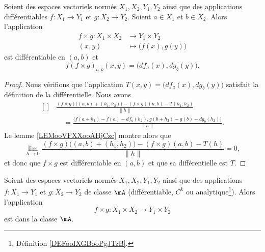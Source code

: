\begin{lemma}	\label{LEMooAAYVooJZyRTq}
	Soient des espaces vectoriels normés \( X_1, X_2,Y_1,Y_2\) ainsi que des applications différentiables \(f \colon X_1\to Y_1  \) et \(g \colon X_2\to Y_2  \). Soient \( a\in X_1\) et \( b\in X_2\). Alors l'application
	\begin{equation}
		\begin{aligned}
			f\times g\colon X_1\times X_2 & \to Y_1\times Y_2              \\
			(x,y)                         & \mapsto \big( f(x), g(y) \big)
		\end{aligned}
	\end{equation}
	est différentiable en \( (a,b)\) et
	\begin{equation}
		f(f\times g)_{a,b}(x,y)=\big( df_a(x), dg_b(y) \big).
	\end{equation}
\end{lemma}

\begin{proof}
	Nous vérifions que l'application \( T(x,y)=\big( df_a(x), dg_b(y) \big)\) satisfait la définition de la différentielle. Nous avons
	\begin{equation}
		\begin{aligned}[]
			 & \frac{ (f\times g)\big( (a,b)+(h_1,h_2) \big)-(f\times g)(a,b)-T(h_1,h_2) }{ \| h \| } \\
			 & \quad=\frac{ \Big( f(a+h_1)-f(a)-df_a(h_2),g(b+h_2)-g(b)-dg_b(h_2) \Big) }{ \| h \| }.
		\end{aligned}
	\end{equation}
	Le lemme \ref{LEMooVFXXooAHjCzc} montre alors que
	\begin{equation}
		\lim_{h\to 0}\frac{ (f\times g)\big( (a,b)+(h_1,h_2) \big)-(f\times g)(a,b)-T(h) }{ \| h \| }=0,
	\end{equation}
	et donc que \( f\times g\) est différentiable en \( (a,b)\) et que sa différentielle est \( T\).
\end{proof}

\begin{proposition}	\label{PROPooPESTooQmWGRJ}
	Soient des espaces vectoriels normés \( X_1, X_2,Y_1,Y_2\) ainsi que des applications \(f \colon X_1\to Y_1  \) et \(g \colon X_2\to Y_2  \) de classe \( \mA\) (différentiable, \( C^k\) ou analytique\footnote{Définition \ref{DEFooIXGBooPgJTzB}.}). Alors l'application
	\begin{equation}
		f\times g \colon X_1\times X_2\to Y_1\times Y_2
	\end{equation}
	est dans la classe \( \mA\).
\end{proposition}


